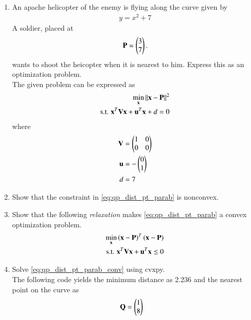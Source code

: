 \renewcommand{\theequation}{\theenumi}
\begin{enumerate}[label=\arabic*.,ref=\thesection.\theenumi]

\item An apache helicopter of the enemy is flying along the curve given by 
	\label{prob:dist_pt_parab}
\begin{align}
\label{eq:dist_pt_parab}
y = x^2 +7
\end{align}
%
A soldier, placed at 
\begin{align}
\mathbf{P} = \begin{pmatrix}3\\7\end{pmatrix}.  
\end{align}
%
wants to shoot the heicopter when it is nearest to him.  Express this as an optimization problem.
\\
\solution The given problem can be expressed as
\begin{align}
\label{eq:qp_dist_pt_parab}
\min_{\mathbf{x}}\left\lVert\mathbf{x}-\mathbf{P}\right\rVert^2
\\
\text{s.t. }\mathbf{x}^T\mathbf{V}\mathbf{x} + \mathbf{u}^T\mathbf{x}  +d = 0
\end{align}
%
where
%
\begin{align}
\mathbf{V} &= \begin{pmatrix}1 & 0\\0 & 0\end{pmatrix}
\\
\mathbf{u} &= -\begin{pmatrix}0 \\ 1\end{pmatrix}
\\
d &= 7
\end{align}
\item Show that the constraint in \ref{eq:qp_dist_pt_parab} is nonconvex.
\item Show that the following {\em relaxation} makes \eqref{eq:qp_dist_pt_parab} a convex optimization problem.
%
\begin{align}
\label{eq:qp_dist_pt_parab_conv}
\min_{\mathbf{x}}\left(\mathbf{x}-\mathbf{P}\right)^T\left(\mathbf{x}-\mathbf{P}\right)
\\
\text{s.t. }\mathbf{x}^T\mathbf{V}\mathbf{x} + \mathbf{u}^T\mathbf{x}  \le 0
\end{align}
%
%
\item Solve \eqref{eq:qp_dist_pt_parab_conv} using cvxpy.
\\
\solution  The following code yields the minimum distance as 2.236 and the nearest point on the curve as
%
\begin{align}
\mathbf{Q} &= \begin{pmatrix}1\\8\end{pmatrix}
\end{align}


\end{enumerate}
